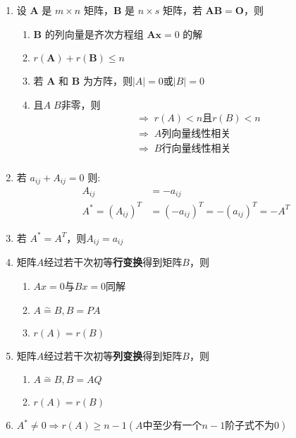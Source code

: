 \documentclass[a4paper,12pt]{article}
\begin{document}
    \begin{enumerate}
        \item 设 $\mathbf{A}$ 是 $m \times n$ 矩阵，$\mathbf{B}$ 是 $n \times s$ 矩阵，若 $\mathbf{AB} = \mathbf{O}$，则
        \begin{enumerate}
            \item $\mathbf{B}$ 的列向量是齐次方程组 $\mathbf{Ax} = 0$ 的解
            \item $r(\mathbf{A}) + r(\mathbf{B}) \le n$
            \item 若 $\mathbf{A}$ 和 $\mathbf{B}$ 为方阵，则$|A| = 0$或$|B| = 0$
            \item 且$A\;B$非零，则
            \begin{align*}
                &\Rightarrow\; r(A) < n\text{且}r(B) < n \\
                &\Rightarrow\; A\text{列向量线性相关} \\
                &\Rightarrow\; B\text{行向量线性相关} \\
            \end{align*}
        \end{enumerate}
        \item 若 $a_{ij} + A_{ij} = 0$ 则:
        \[
            \begin{aligned}
                A_{ij} &= -a_{ij} \\
                A^* = (A_{ij})^T &= (-a_{ij})^T = -(a_{ij})^T = -A^T
            \end{aligned}
        \]
        \item 若 $A^* = A^T$，则$A_{ij} = a_{ij}$
        \item 矩阵$A$经过若干次初等\textbf{行变换}得到矩阵$B$，则
        \begin{enumerate}
            \item $Ax = 0$与$Bx = 0$同解
            \item $A \overset{\sim}{=} B, B = PA$
            \item $r(A) = r(B)$
        \end{enumerate}
        \item 矩阵$A$经过若干次初等\textbf{列变换}得到矩阵$B$，则
        \begin{enumerate}
            \item $A \overset{\sim}{=} B, B = AQ$
            \item $r(A) = r(B)$
        \end{enumerate}
        \item $A^* \neq 0 \Rightarrow r(A) \ge n - 1(A\text{中至少有一个}n-1\text{阶子式不为0})$

\end{enumerate}
\end{document}
